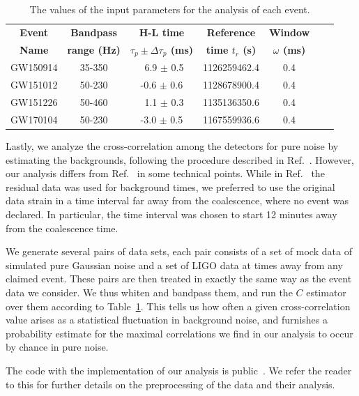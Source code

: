 \documentclass[a4paper,11pt]{article}
\begin{document}
\begin{table}
\centering
\begin{tabular}{|c | c | c | c | c | c | c |}
 \hline
 \textbf{Event} & \textbf{Bandpass} & \textbf{H-L time} & \textbf{Reference} & \textbf{Window} \\
 \textbf{Name} & \textbf{range (Hz)} &   \textbf{$\tau_p \pm \Delta \tau_p$ (ms)} & \textbf{time $t_r$ (s)} & \textbf{$\omega$ (ms)}\\
 \hline
 GW150914 & 35-350 &  ~6.9 $\pm$ 0.5  & 1126259462.4 & 0.4\\  
 GW151012 & 50-230 &  -0.6 $\pm$ 0.6 & 1128678900.4  & 0.4\\
 GW151226 & 50-460 &  ~1.1 $\pm$ 0.3 & 1135136350.6   & 0.4\\
 GW170104 & 50-230 &  -3.0 $\pm$ 0.5 & 1167559936.6 & 0.4\\
 \hline
\end{tabular}%
\caption{The values of the input parameters for the analysis of each event.}
\label{tab:table1}
\end{table}

Lastly, we  analyze the cross-correlation among the detectors for pure noise by estimating the backgrounds, following the procedure described in Ref.~\cite{Nielsen:2018bhc}.
However, our analysis differs from Ref.~\cite{Nielsen:2018bhc} in some technical points.
While in Ref.~\cite{Nielsen:2018bhc} the residual data was used for background times, we preferred to use the original data strain in a time interval far away from the coalescence, where no event was declared.
In particular, the time interval was chosen to start 12 minutes away from the coalescence time.

We generate several pairs of data sets, each pair consists of a set of mock data of simulated pure Gaussian noise and a set of LIGO data at times away from any claimed event. These pairs are then treated in exactly the same way as the event data we consider. We thus whiten and bandpass them, and run the $C$  estimator over them according to Table~\ref{tab:table1}. This tells us how often a given cross-correlation value arises as a statistical fluctuation in background noise, and furnishes
a probability estimate for the maximal correlations we find in our analysis to occur by chance in pure noise.


The code with the implementation of our analysis is public~\cite{pipeline}. We refer the reader to this for further details on the preprocessing of the data and their analysis.  
\end{document}
